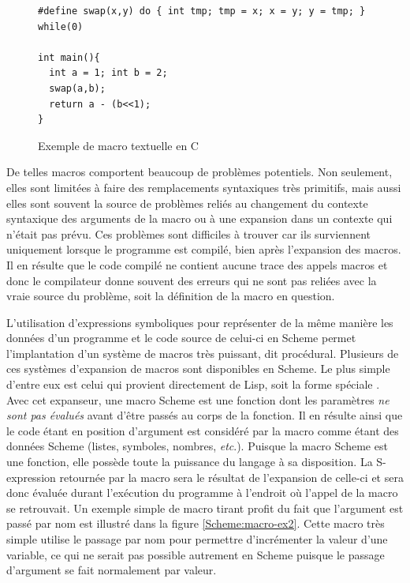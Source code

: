 \documentclass[12pt,twoside,letterpaper,francais]{book}
\newcommand{\scheme}[1]{\selectlanguage{english}{\tt #1}\selectlanguage{french}}
\begin{document}
\begin{figure}[htb!]
  \begin{verbatim}
#define swap(x,y) do { int tmp; tmp = x; x = y; y = tmp; } while(0)

int main(){
  int a = 1; int b = 2;
  swap(a,b);
  return a - (b<<1);
}
  \end{verbatim}
  \caption{Exemple de macro textuelle en C}
  \label{Scheme:c-macros}
\end{figure}

De telles macros comportent beaucoup de problèmes potentiels. Non
seulement, elles sont limitées à faire des remplacements syntaxiques
très primitifs, mais aussi elles sont souvent la source de problèmes
reliés au changement du contexte syntaxique des arguments de la macro
ou à une expansion dans un contexte qui n'était pas prévu. Ces
problèmes sont difficiles à trouver car ils surviennent uniquement
lorsque le programme est compilé, bien après l'expansion des
macros. Il en résulte que le code compilé ne contient aucune trace des
appels macros et donc le compilateur donne souvent des erreurs qui ne
sont pas reliées avec la vraie source du problème, soit la définition
de la macro en question.

L'utilisation d'expressions symboliques pour représenter de la même
manière les données d'un programme et le code source de celui-ci en
Scheme permet l'implantation d'un système de macros très puissant, dit
procédural. Plusieurs de ces systèmes d'expansion de macros sont
disponibles en Scheme. Le plus simple d'entre eux est celui qui
provient directement de Lisp, soit la forme spéciale
\scheme{define-macro}. Avec cet expanseur, une macro Scheme est une
fonction dont les paramètres \emph{ne sont pas évalués} avant d'être
passés au corps de la fonction. Il en résulte ainsi que le code étant
en position d'argument est considéré par la macro comme étant des
données Scheme (listes, symboles, nombres, \textit{etc}.). Puisque la
macro Scheme est une fonction, elle possède toute la puissance du
langage à sa disposition. La S-expression retournée par la macro sera
le résultat de l'expansion de celle-ci et sera donc évaluée durant
l'exécution du programme à l'endroit où l'appel de la macro se
retrouvait. Un exemple simple de macro tirant profit du fait que
l'argument est passé par nom est illustré dans la figure
\ref{Scheme:macro-ex2}. Cette macro très simple utilise le passage par
nom pour permettre d'incrémenter la valeur d'une variable, ce qui ne
serait pas possible autrement en Scheme puisque le passage d'argument
se fait normalement par valeur.\\
\end{document}
